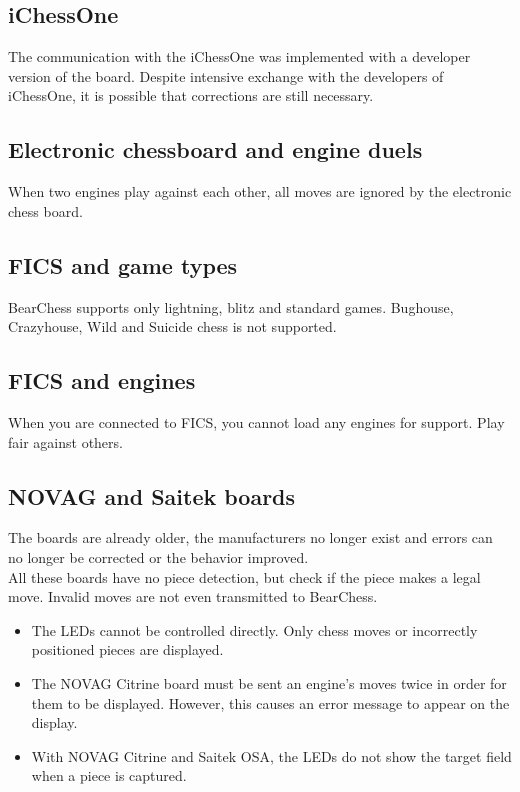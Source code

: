 \documentclass[11pt,a4paper]{article}
\begin{document}
\subsection{iChessOne}
The communication with the iChessOne was implemented with a developer version of the board. Despite intensive exchange with the developers of iChessOne, it is possible that corrections are still necessary.


\subsection{Electronic chessboard and engine duels}
When two engines play against each other, all moves are ignored by the electronic chess board.


\subsection{FICS and game types}
BearChess supports only lightning, blitz and standard games. Bughouse, Crazyhouse, Wild and Suicide chess is not supported.

\subsection{FICS and engines}
When you are connected to FICS, you cannot load any engines for support. Play fair against others.

\subsection{NOVAG and Saitek boards}
The boards are already older, the manufacturers no longer exist and errors can no longer be corrected or the behavior improved.\\
All these boards have no piece detection, but check if the piece makes a legal move. Invalid moves are not even transmitted to BearChess.
\begin{itemize}
	\item The LEDs cannot be controlled directly. Only chess moves or incorrectly positioned pieces are displayed.
	\item The NOVAG Citrine board must be sent an engine's moves twice in order for them to be displayed. However, this causes an error message to appear on the display.
	\item With NOVAG Citrine and Saitek OSA, the LEDs do not show the target field when a piece is captured.
\end{itemize}
\end{document}
